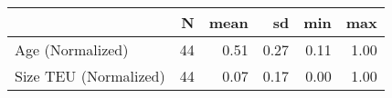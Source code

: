 
\begin{tabular}[t]{lrrrrr}
\toprule
  & N & mean & sd & min & max\\
\midrule
Age (Normalized) & 44 & 0.51 & 0.27 & 0.11 & 1.00\\
Size TEU (Normalized) & 44 & 0.07 & 0.17 & 0.00 & 1.00\\
\bottomrule
\end{tabular}
